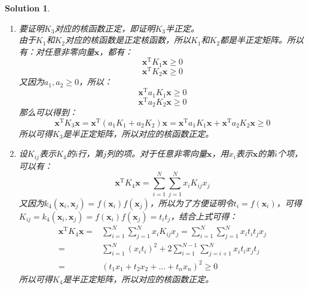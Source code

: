 \documentclass[a4paper,UTF8]{article}
\numberwithin{equation}{section}
\newtheorem*{mySol}{Solution}
\begin{document}
\begin{mySol}
\begin{enumerate}[(1)]
~\\
\item
要证明$K_3$对应的核函数正定，即证明$K_3$半正定。\\
由于$K_1$和$K_2$对应的核函数是正定核函数，所以$K_1$和$K_2$都是半正定矩阵。所以有：对任意非零向量$\mathbf{x}$，都有：\\
\begin{equation}
\mathbf{x}^\mathrm{T}K_1\mathbf{x} \geq 0
\end{equation}
\begin{equation}
\mathbf{x}^\mathrm{T}K_2\mathbf{x} \geq 0
\end{equation}
又因为$a_1,a_2\geq 0$，所以：
\begin{equation}
\mathbf{x}^\mathrm{T}a_1K_1\mathbf{x} \geq 0
\end{equation}
\begin{equation}
\mathbf{x}^\mathrm{T}a_2K_2\mathbf{x} \geq 0
\end{equation}
那么可以得到：
\begin{equation}
\mathbf{x}^\mathrm{T}K_3\mathbf{x} = \mathbf{x}^\mathrm{T}(a_1K_1+a_2K_2)\mathbf{x} = \mathbf{x}^\mathrm{T}a_1K_1\mathbf{x} + \mathbf{x}^\mathrm{T}a_2K_2\mathbf{x} \geq 0
\end{equation}
所以可得$K_3$是半正定矩阵，所以对应的核函数正定。
\item 
设$K_{ij}$表示$K_4$的$i$行，第$j$列的项。对于任意非零向量$\mathbf{x}$，用$x_i$表示$\mathbf{x}$的第$i$个项，可以有：
\begin{equation}
\mathbf{x}^\mathrm{T}K_4\mathbf{x} = \sum_{i=1}^{N}\sum_{j=1}^{N}x_iK_{ij}x_j
\end{equation}
又因为$k_4(\mathbf{x}_i,\mathbf{x}_j)=f(\mathbf{x}_i)f(\mathbf{x}_j)$，所以为了方便证明令$t_i = f(\mathbf{x}_i)$，可得$K_{ij}=k_4(\mathbf{x}_i,\mathbf{x}_j)=f(\mathbf{x}_i)f(\mathbf{x}_j)=t_it_j$，结合上式可得：
\begin{equation}
\begin{aligned}
\mathbf{x}^\mathrm{T}K_4\mathbf{x} =& \sum_{i=1}^{N}\sum_{j=1}^{N}x_iK_{ij}x_j = \sum_{i=1}^{N}\sum_{j=1}^{N}x_it_it_jx_j\\ 
=& \sum_{i=1}^{N}(x_it_i)^2 + 2\sum_{i=1}^{N-1}\sum_{j=i+1}^{N}x_it_ix_jt_j\\
=& (t_1x_1 + t_2x_2 +...+ t_nx_n)^2 \geq 0
\end{aligned}
\end{equation}
所以可得$K_4$是半正定矩阵，所以对应的核函数正定。
\end{enumerate}
\end{mySol}
\newpage
\end{document}
